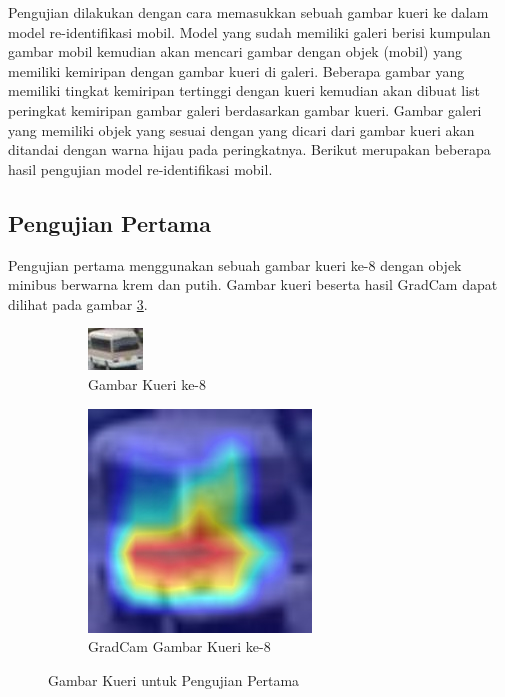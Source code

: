 Pengujian dilakukan dengan cara memasukkan sebuah gambar kueri ke dalam model re-identifikasi mobil. Model yang sudah memiliki 
galeri berisi kumpulan gambar mobil kemudian akan mencari gambar dengan objek (mobil) yang memiliki kemiripan dengan gambar 
kueri di galeri. Beberapa gambar yang memiliki tingkat kemiripan tertinggi dengan kueri kemudian akan dibuat list peringkat 
kemiripan gambar galeri berdasarkan gambar kueri. Gambar galeri yang memiliki objek yang sesuai dengan yang dicari dari gambar 
kueri akan ditandai dengan warna hijau pada peringkatnya. Berikut merupakan beberapa hasil pengujian model re-identifikasi mobil.

\subsection{Pengujian Pertama}

Pengujian pertama menggunakan sebuah gambar kueri ke-8 dengan objek minibus \linebreak berwarna krem dan putih. Gambar kueri 
beserta hasil GradCam dapat dilihat pada gambar \ref{fig:gambarkueriuntukpengujianpertama}.

\begin{figure}[h!]
  \centering
  \begin{subfigure}{.5\textwidth}
    \centering
    \includegraphics[width=.4\linewidth]{gambar/Que8_1018.jpg}
    \caption{Gambar Kueri ke-8}
    \label{gambarkuerinomordelapan}
  \end{subfigure}%
  \begin{subfigure}{.5\textwidth}
    \centering
    \includegraphics[width=.4\linewidth]{gambar/GradCamQue8_1018.jpg}
    \caption{GradCam Gambar Kueri ke-8}
    \label{gradcamgambarkuerinomordelapan}
  \end{subfigure}
  \caption{Gambar Kueri untuk Pengujian Pertama}
  \label{fig:gambarkueriuntukpengujianpertama}
\end{figure}


